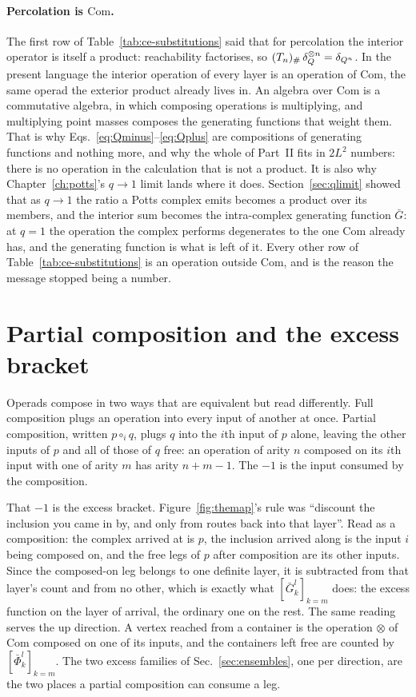 \paragraph{Percolation is $\mathrm{Com}$.} The first row of
Table~\ref{tab:ce-substitutions} said that for percolation the interior
operator is itself a product: reachability factorises, so
$(T_{n})_{\#}\,\delta_{Q}^{\otimes n}=\delta_{Q^{n}}$. In the present language
the interior operation of every layer is an operation of $\mathrm{Com}$, the
same operad the exterior product already lives in. An algebra over
$\mathrm{Com}$ is a commutative algebra, in which composing operations is
multiplying, and multiplying point masses composes the generating functions
that weight them. That is why Eqs.~\eqref{eq:Qminus}--\eqref{eq:Qplus} are
compositions of generating functions and nothing more, and why the whole of
Part~II fits in $2L^{2}$ numbers: there is no operation in the calculation
that is not a product. It is also why Chapter~\ref{ch:potts}'s $q\to1$ limit
lands where it does. Section~\ref{sec:qlimit} showed that as $q\to1$ the
ratio a Potts complex emits becomes a product over its members, and the
interior sum becomes the intra-complex generating function $\bar G$: at $q=1$
the operation the complex performs degenerates to the one $\mathrm{Com}$
already has, and the generating function is what is left of it. Every other
row of Table~\ref{tab:ce-substitutions} is an operation outside
$\mathrm{Com}$, and is the reason the message stopped being a number.

\section{Partial composition and the excess bracket}
\label{sec:op-partial}

Operads compose in two ways that are equivalent but read differently. Full
composition plugs an operation into every input of another at once. Partial
composition, written $p\circ_{i}q$, plugs $q$ into the $i$th input of $p$
alone, leaving the other inputs of $p$ and all of those of $q$ free: an
operation of arity $n$ composed on its $i$th input with one of arity $m$ has
arity $n+m-1$. The $-1$ is the input consumed by the composition.

That $-1$ is the excess bracket. Figure~\ref{fig:themap}'s rule was
``discount the inclusion you came in by, and only from routes back into that
layer''. Read as a composition: the complex arrived at is $p$, the inclusion
arrived along is the input $i$ being composed on, and the free legs of $p$
after composition are its other inputs. Since the composed-on leg belongs to
one definite layer, it is subtracted from that layer's count and from no
other, which is exactly what $[\bar G^{l}_{k}]_{k=m}$ does: the excess
function on the layer of arrival, the ordinary one on the rest. The same
reading serves the up direction. A vertex reached from a container is the
operation $\otimes$ of $\mathrm{Com}$ composed on one of its inputs, and the
containers left free are counted by $[\bar\Phi^{l}_{k}]_{k=m}$. The two
excess families of Sec.~\ref{sec:ensembles}, one per direction, are the two
places a partial composition can consume a leg.

